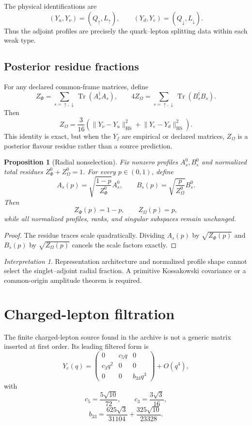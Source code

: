 \documentclass[11pt,oneside,openany]{book}
\numberwithin{equation}{chapter}
\newtheorem{proposition}[theorem]{Proposition}
\theoremstyle{definition}
\theoremstyle{remark}
\newtheorem{interpretation}[theorem]{Interpretation}
\newcommand{\Tr}{\operatorname{Tr}}
\newcommand{\HS}{\mathrm{HS}}
\newcommand{\norm}[1]{\lVert #1\rVert}
\begin{document}
The physical identifications are
\[
 (Y_u,Y_\nu)=(Q_\uparrow,L_\uparrow),
 \qquad
 (Y_d,Y_e)=(Q_\downarrow,L_\downarrow).
\]
Thus the adjoint profiles are precisely the quark--lepton splitting data within each weak type.

\section{Posterior residue fractions}
For any declared common-frame matrices, define
\[
 Z_\Phi=\sum_{s=\uparrow,\downarrow}\Tr(A_s^\dagger A_s),
 \qquad
 4Z_\Omega=\sum_{s=\uparrow,\downarrow}\Tr(B_s^\dagger B_s).
\]
Then
\[
 \boxed{
 Z_\Omega
 =\frac3{16}
 \left(
 \norm{Y_\nu-Y_u}_{\HS}^2
 +\norm{Y_e-Y_d}_{\HS}^2
 \right).
 }
\]
This identity is exact, but when the $Y_f$ are empirical or declared matrices, $Z_\Omega$ is a posterior flavour residue rather than a source prediction.

\begin{proposition}[Radial nonselection]
\label{prop:radial-nonselection}
Fix nonzero profiles $A_s^0,B_s^0$ and normalized total residues $Z_\Phi^0+Z_\Omega^0=1$.  For every $p\in(0,1)$, define
\[
 A_s(p)=\sqrt{\frac{1-p}{Z_\Phi^0}}A_s^0,
 \qquad
 B_s(p)=\sqrt{\frac{p}{Z_\Omega^0}}B_s^0.
\]
Then
\[
 Z_\Phi(p)=1-p,
 \qquad
 Z_\Omega(p)=p,
\]
while all normalized profiles, ranks, and singular subspaces remain unchanged.
\end{proposition}

\begin{proof}
The residue traces scale quadratically.  Dividing $A_s(p)$ by $\sqrt{Z_\Phi(p)}$ and $B_s(p)$ by $\sqrt{Z_\Omega(p)}$ cancels the scale factors exactly.
\end{proof}

\begin{interpretation}
Representation architecture and normalized profile shape cannot select the singlet--adjoint radial fraction.  A primitive Kossakowski covariance or a common-origin amplitude theorem is required.
\end{interpretation}

\chapter{Charged-lepton filtration}
\label{ch:charged-lepton}

The finite charged-lepton source found in the archive is not a generic matrix inserted at first order.  Its leading filtered form is
\[
 Y_e(q)=
 \begin{pmatrix}
 0&c_5q&0\\
 c_3q^2&0&0\\
 0&0&b_{33}q^3
 \end{pmatrix}+O(q^4),
\]
with
\[
 c_5=\frac{5\sqrt{10}}{72},
 \qquad
 c_3=\frac{3\sqrt3}{16},
\]
\[
 b_{33}=\frac{625\sqrt3}{31104}
 +\frac{325\sqrt{10}}{23328}.
\]
\end{document}

